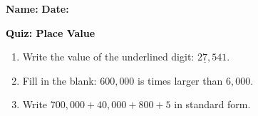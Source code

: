 \documentclass[12pt, letterpaper, fleqn]{article}
\newcommand{\blank}{\underline{\hspace{2.2cm}}}
\begin{document}
\textbf{Name:} \underline{\hspace{5cm}}
\hfill
\textbf{Date:} \underline{\hspace{3cm}}\\

\begin{tcolorbox}[colback=customteal!20]
    \large\textcolor{black}{\textbf{Quiz: Place Value}}
\end{tcolorbox}
\begin{enumerate}[itemsep=3.5cm, leftmargin=0.6cm]
\item Write the value of the underlined digit: $2\underline{7},541$.
\vspace{3cm}
\item Fill in the blank: $600,000$ is \blank times larger than $6,000$.
\vspace{3cm}
\item Write $700,000 + 40,000 + 800 + 5$ in standard form.
\end{enumerate}
\end{document}
